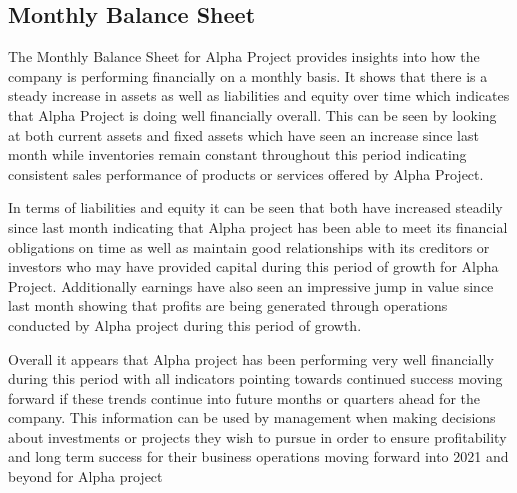 

\subsection{Monthly Balance Sheet \label{sec:title}}

The Monthly Balance Sheet for Alpha Project provides insights into how the company is performing financially on a monthly basis. It shows that there is a steady increase in assets as well as liabilities and equity over time which indicates that Alpha Project is doing well financially overall. This can be seen by looking at both current assets and fixed assets which have seen an increase since last month while inventories remain constant throughout this period indicating consistent sales performance of products or services offered by Alpha Project. 

In terms of liabilities and equity it can be seen that both have increased steadily since last month indicating that Alpha project has been able to meet its financial obligations on time as well as maintain good relationships with its creditors or investors who may have provided capital during this period of growth for Alpha Project. Additionally earnings have also seen an impressive jump in value since last month showing that profits are being generated through operations conducted by Alpha project during this period of growth. 

Overall it appears that Alpha project has been performing very well financially during this period with all indicators pointing towards continued success moving forward if these trends continue into future months or quarters ahead for the company. This information can be used by management when making decisions about investments or projects they wish to pursue in order to ensure profitability and long term success for their business operations moving forward into 2021 and beyond for Alpha project